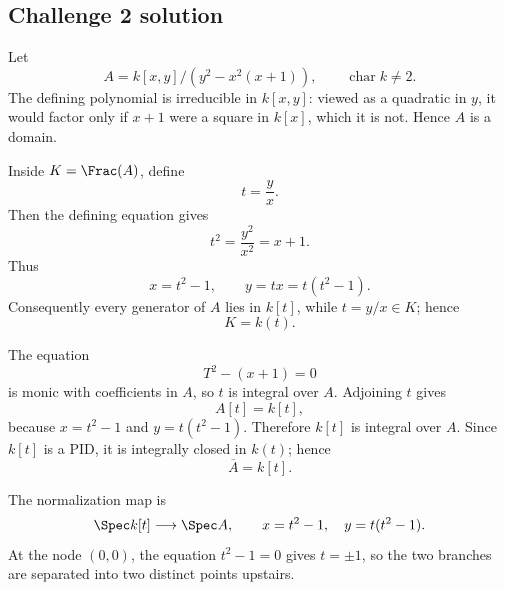 \subsection*{Challenge 2 solution}
\begin{solution}
Let
\[
A=k[x,y]/(y^2-x^2(x+1)),
\qquad
\operatorname{char}k\ne2.
\]
The defining polynomial is irreducible in \(k[x,y]\): viewed as a quadratic in \(y\), it would factor only if
\(x+1\) were a square in \(k[x]\), which it is not. Hence \(A\) is a domain.

Inside \(K=\Frac(A)\), define
\[
t=\frac yx.
\]
Then the defining equation gives
\[
t^2=\frac{y^2}{x^2}=x+1.
\]
Thus
\[
x=t^2-1,
\qquad
y=tx=t(t^2-1).
\]
Consequently every generator of \(A\) lies in \(k[t]\), while \(t=y/x\in K\); hence
\[
K=k(t).
\]

The equation
\[
T^2-(x+1)=0
\]
is monic with coefficients in \(A\), so \(t\) is integral over \(A\). Adjoining \(t\) gives
\[
A[t]=k[t],
\]
because \(x=t^2-1\) and \(y=t(t^2-1)\). Therefore \(k[t]\) is integral over \(A\). Since \(k[t]\) is a PID,
it is integrally closed in \(k(t)\); hence
\[
\boxed{\overline A=k[t].}
\]

The normalization map is
\[
\Spec k[t]\longrightarrow\Spec A,
\qquad
x=t^2-1,\quad y=t(t^2-1).
\]
At the node \((0,0)\), the equation \(t^2-1=0\) gives \(t=\pm1\), so the two branches are separated into two
distinct points upstairs.
\end{solution}

